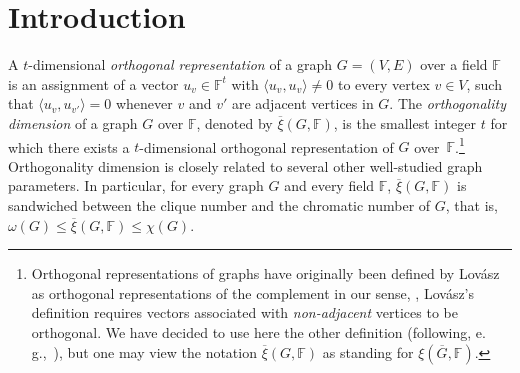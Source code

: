 \documentclass{toc}
\newcommand{\Fset}{\mathbb{F}}
\newcommand{\od}{\overline{\xi}}
\begin{document}
\begin{frontmatter}
%

\end{frontmatter}

%
%
%

\section{Introduction}

A $t$-dimensional \emph{orthogonal representation} of a graph $G=(V,E)$ over a field $\Fset$ is an assignment of a vector $u_v \in \Fset^t$ with $\langle u_v,u_v \rangle \neq 0$ to every vertex $v \in V$, such that $\langle u_v, u_{v'} \rangle = 0$ whenever $v$ and $v'$ are adjacent vertices in $G$. The \emph{orthogonality dimension} of a graph $G$ over $\Fset$, denoted by $\od(G, \Fset)$, is the smallest integer $t$ for which there exists a $t$-dimensional orthogonal representation of $G$ over~$\Fset$.\footnote{Orthogonal representations of graphs
%
have originally been defined by Lov\'asz~\cite{Lovasz79}
as orthogonal representations of the complement
in our sense,  %
%
\ie, Lov\'asz's  %
definition requires vectors associated with \emph{non-adjacent} vertices to be orthogonal.
We have decided to use here the other definition (following, e.\,g.,~\cite{deWolfThesis,BrietBLPS15,BrietZ17}), but one may view the notation $\od(G,\Fset)$ as standing for $\xi(\overline{G},\Fset)$.}
%
Orthogonality dimension  %
is closely related to several other well-studied graph parameters. In particular, for every graph $G$ and every field $\Fset$, $\od(G, \Fset)$ is sandwiched between the clique number and the chromatic number of $G$, that is, $\omega(G) \leq \od(G, \Fset) \leq \chi(G)$.
\end{document}

